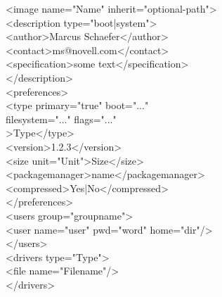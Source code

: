 \begin{itemize}
      \begin{Command}{15cm}
      <image name="Name" inherit="optional-path">\\
      \hspace*{1cm}<description type="boot|system">\\
      \hspace*{2cm}<author>Marcus Schaefer</author>\\
      \hspace*{2cm}<contact>ms@novell.com</contact>\\
      \hspace*{2cm}<specification>some text</specification>\\
      \hspace*{1cm}</description>\\
      \hspace*{1cm}<preferences>\\
      \hspace*{2cm}<type primary="true" boot="..."\\
      \hspace*{3cm}filesystem="..." flags="..."\\
      \hspace*{2cm}>Type</type>\\
      \hspace*{2cm}<version>1.2.3</version>\\
      \hspace*{2cm}<size unit="Unit">Size</size>\\
      \hspace*{2cm}<packagemanager>name</packagemanager>\\
      \hspace*{2cm}<compressed>Yes|No</compressed>\\
      \hspace*{1cm}</preferences>\\
      \hspace*{1cm}<users group="groupname">\\
      \hspace*{2cm}<user name="user" pwd="word" home="dir"/>\\
      \hspace*{1cm}</users>\\
      \hspace*{1cm}<drivers type="Type">\\
      \hspace*{2cm}<file name="Filename"/>\\
      \hspace*{1cm}</drivers>\\

\end{Command}
\end{itemize}

